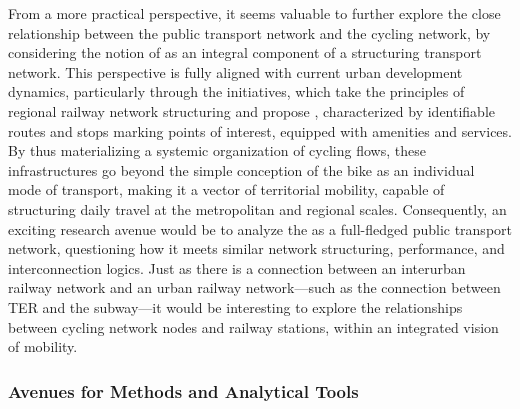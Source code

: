 \begin{refsegment}
From a more practical perspective, it seems valuable to further explore the close relationship between the public transport network and the cycling network, by considering the notion of  as an integral component of a structuring transport network. This perspective is fully aligned with current urban development dynamics, particularly through the  initiatives, which take the principles of regional railway network structuring and propose , characterized by identifiable routes and stops marking points of interest, equipped with amenities and services. By thus materializing a systemic organization of cycling flows, these infrastructures go beyond the simple conception of the bike as an individual mode of transport, making it a vector of territorial mobility, capable of structuring daily travel at the metropolitan and regional scales. Consequently, an exciting research avenue would be to analyze the  as a full-fledged public transport network, questioning how it meets similar network structuring, performance, and interconnection logics. Just as there is a  connection between an interurban railway network and an urban railway network—such as the connection between \acrshort{TER} and the subway—it would be interesting to explore the relationships between cycling network nodes and railway stations, within an integrated vision of mobility.%

\subsubsection*{Avenues for Methods and Analytical Tools
    \label{conclusion-generale:perspectives-pistes-methodes}
    }


\end{refsegment}
